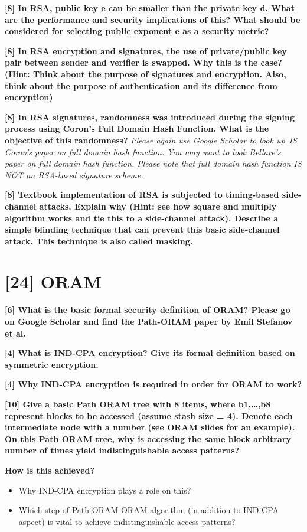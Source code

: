 \documentclass[letterpaper,11pt,notitlepage,fleqn]{article}
\begin{document}
\noindent \textbf{[8]  In  RSA,  public  key  e  can  be  smaller  than  the  private  key  d.  What  are  the performance  and  security  implications  of  this?  What  should  be  considered  for selecting public exponent e as a security metric?}

\noindent \textbf{[8]  In  RSA  encryption  and  signatures,  the  use  of  private/public  key  pair  between sender  and  verifier  is  swapped.  Why  this  is  the  case?  (Hint:  Think  about  the purpose  of  signatures  and  encryption.  Also,  think  about  the  purpose  of authentication and its difference from encryption)}

\noindent \textbf{[8]  In  RSA  signatures,  randomness  was  introduced  during  the  signing  process using  Coron’s  Full  Domain  Hash  Function.  What  is  the  objective  of  this randomness?} \textit{Please again use Google Scholar to look up JS Coron’s paper on full domain hash  function. You may want  to  look Bellare’s paper on  full domain hash function.  Please  note  that  full  domain  hash  function  IS  NOT  an  RSA-based signature scheme.}

\noindent \textbf{[8]  Textbook  implementation  of  RSA    is  subjected  to  timing-based  side-channel attacks. Explain why  (Hint:  see how  square  and multiply  algorithm works  and  tie this  to  a  side-channel  attack).  Describe  a  simple  blinding  technique  that  can prevent this basic side-channel attack. This technique is also called masking.}
 
 
\section{[24] ORAM}
 
 
 
\noindent \textbf{[6] What is the basic formal security definition of ORAM? Please go on Google Scholar and find the Path-ORAM paper by Emil Stefanov et al.} 
 
 
 
\noindent \textbf{[4] What is IND-CPA encryption? Give its formal definition based on symmetric encryption.}
 
 
 
\noindent \textbf{[4] Why IND-CPA encryption is required in order for ORAM to work?}
 
 
\noindent \textbf{[10] Give a basic Path ORAM tree with 8 items, where b1,…,b8 represent blocks to be accessed (assume stash size = 4). Denote each intermediate node with a number (see ORAM slides for an example). On this Path ORAM tree, why is accessing the same block arbitrary number of times yield indistinguishable access patterns?} 

\noindent \textbf{How is this achieved?}
\begin{itemize}
    \item Why IND-CPA encryption plays a role on this?
    \item Which  step  of  Path-ORAM  ORAM  algorithm  (in  addition  to  IND-CPA aspect) is vital to achieve indistinguishable access patterns?
\end{itemize}

\medskip


\end{document}
